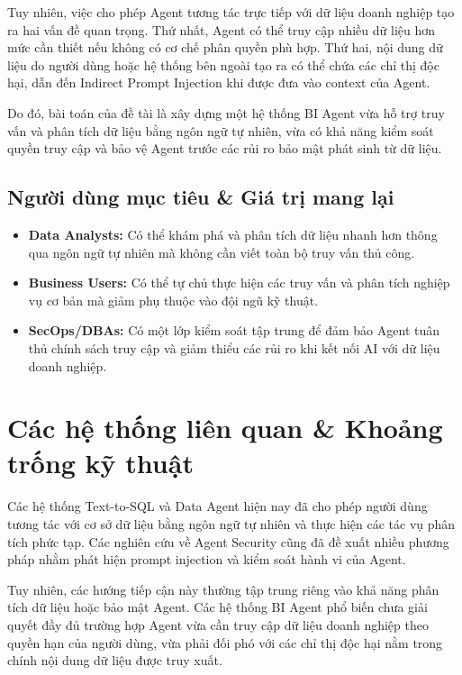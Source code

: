 Tuy nhiên, việc cho phép Agent tương tác trực tiếp với dữ liệu doanh nghiệp tạo ra hai vấn đề quan trọng. Thứ nhất, Agent có thể truy cập nhiều dữ liệu hơn mức cần thiết nếu không có cơ chế phân quyền phù hợp. Thứ hai, nội dung dữ liệu do người dùng hoặc hệ thống bên ngoài tạo ra có thể chứa các chỉ thị độc hại, dẫn đến Indirect Prompt Injection khi được đưa vào context của Agent.

Do đó, bài toán của đề tài là xây dựng một hệ thống BI Agent vừa hỗ trợ truy vấn và phân tích dữ liệu bằng ngôn ngữ tự nhiên, vừa có khả năng kiểm soát quyền truy cập và bảo vệ Agent trước các rủi ro bảo mật phát sinh từ dữ liệu.

\subsection{Người dùng mục tiêu \& Giá trị mang lại}

\begin{itemize}
\item \textbf{Data Analysts:} Có thể khám phá và phân tích dữ liệu nhanh hơn thông qua ngôn ngữ tự nhiên mà không cần viết toàn bộ truy vấn thủ công.

\item \textbf{Business Users:} Có thể tự chủ thực hiện các truy vấn và phân tích nghiệp vụ cơ bản mà giảm phụ thuộc vào đội ngũ kỹ thuật.

\item \textbf{SecOps/DBAs:} Có một lớp kiểm soát tập trung để đảm bảo Agent tuân thủ chính sách truy cập và giảm thiểu các rủi ro khi kết nối AI với dữ liệu doanh nghiệp.

\end{itemize}

\section{Các hệ thống liên quan \& Khoảng trống kỹ thuật}

Các hệ thống Text-to-SQL và Data Agent hiện nay đã cho phép người dùng tương tác với cơ sở dữ liệu bằng ngôn ngữ tự nhiên và thực hiện các tác vụ phân tích phức tạp. Các nghiên cứu về Agent Security cũng đã đề xuất nhiều phương pháp nhằm phát hiện prompt injection và kiểm soát hành vi của Agent.

Tuy nhiên, các hướng tiếp cận này thường tập trung riêng vào khả năng phân tích dữ liệu hoặc bảo mật Agent. Các hệ thống BI Agent phổ biến chưa giải quyết đầy đủ trường hợp Agent vừa cần truy cập dữ liệu doanh nghiệp theo quyền hạn của người dùng, vừa phải đối phó với các chỉ thị độc hại nằm trong chính nội dung dữ liệu được truy xuất.

